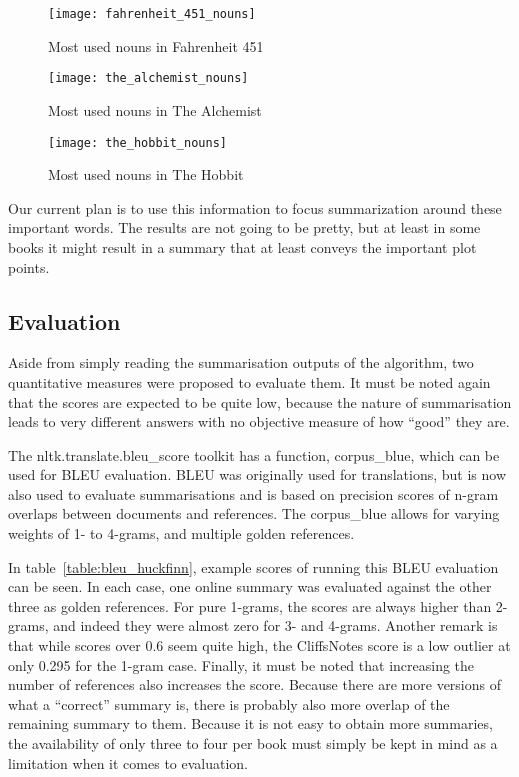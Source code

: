 \begin{figure}[h]
	\centering
	\texttt{[image: fahrenheit\_451\_nouns]}
	\caption{Most used nouns in Fahrenheit 451}\label{fig:fahrenheit_451_nouns}
\end{figure}

\begin{figure}[h]
	\centering
	\texttt{[image: the\_alchemist\_nouns]}
	\caption{Most used nouns in The Alchemist}\label{fig:the_alchemist_nouns}
\end{figure}

\begin{figure}[h]
	\centering
	\texttt{[image: the\_hobbit\_nouns]}
	\caption{Most used nouns in The Hobbit}\label{fig:the_hobbit_nouns}
\end{figure}

Our current plan is to use this information to focus summarization around these
important words. The results are not going to be pretty, but at least in some
books it might result in a summary that at least conveys the important plot
points.

\subsection{Evaluation}
Aside from simply reading the summarisation outputs of the algorithm, two
quantitative measures were proposed to evaluate them. It must be noted again
that the scores are expected to be quite low, because the nature of
summarisation leads to very different answers with no objective measure of how
``good'' they are. 

The nltk.translate.bleu\_score toolkit has a function, corpus\_blue, which can
be used for BLEU evaluation. BLEU was originally used for translations, but is
now also used to evaluate summarisations and is based on precision scores of
n-gram overlaps between documents and references. The corpus\_blue allows for
varying weights of 1- to 4-grams, and multiple golden references. 

In table~\ref{table:bleu_huckfinn}, example scores of running this BLEU
evaluation can be seen. In each case, one online summary was evaluated against
the other three as golden references. For pure 1-grams, the scores are always
higher than 2-grams, and indeed they were almost zero for 3- and 4-grams.
Another remark is that while scores over 0.6 seem quite high, the CliffsNotes
score is a low outlier at only 0.295 for the 1-gram case. Finally, it must be
noted that increasing the number of references also increases the score.
Because there are more versions of what a ``correct'' summary is, there is
probably also more overlap of the remaining summary to them. Because it is not
easy to obtain more summaries, the availability of only three to four per book
must simply be kept in mind as a limitation when it comes to evaluation.


